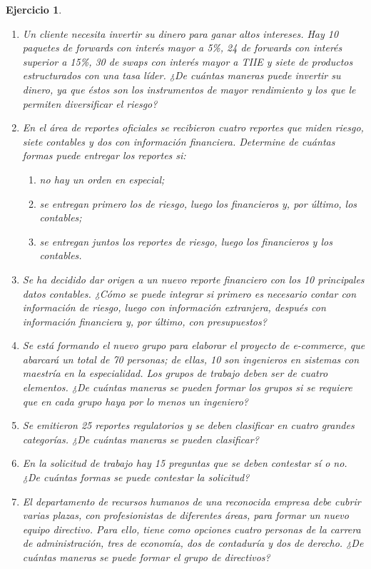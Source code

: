 \documentclass[12pt,twoside]{article}
\newtheorem{Ejer}{Ejercicio}
\begin{document}
\begin{Ejer}
\begin{enumerate}
\item Un cliente necesita invertir su dinero para ganar altos intereses. Hay 10 paquetes de forwards con interés mayor a 5\%, 24 de forwards con interés superior a 15\%, 30 de swaps con interés mayor a TIIE y siete de productos estructurados con una tasa líder. ¿De cuántas maneras puede invertir su dinero, ya que éstos son los instrumentos de mayor rendimiento y los que le permiten diversificar el riesgo?

\item En el área de reportes oficiales se recibieron cuatro reportes que miden riesgo, siete contables y dos con información financiera. Determine de cuántas formas puede entregar los reportes si:
\begin{enumerate}
\item no hay un orden en especial;
\item se entregan primero los de riesgo, luego los financieros y, por último, los contables;
\item se entregan juntos los reportes de riesgo, luego los financieros y los contables.
\end{enumerate}

\item Se ha decidido dar origen a un nuevo reporte financiero con los 10 principales datos contables. ¿Cómo se puede integrar si primero es necesario contar con información de riesgo, luego con información extranjera, después con información financiera y, por último, con presupuestos?

\item Se está formando el nuevo grupo para elaborar el proyecto de e-commerce, que abarcará un total de 70 personas; de ellas, 10 son ingenieros en sistemas con maestría en la especialidad. Los grupos de trabajo deben ser de cuatro elementos. ¿De cuántas maneras se pueden formar los grupos si se requiere que en cada grupo haya por lo menos un ingeniero?

\item Se emitieron 25 reportes regulatorios y se deben clasificar en cuatro grandes categorías. ¿De cuántas maneras se pueden clasificar?

\item En la solicitud de trabajo hay 15 preguntas que se deben contestar sí o no. ¿De cuántas formas se puede contestar la solicitud?

\item El departamento de recursos humanos de una reconocida empresa debe cubrir varias plazas, con profesionistas de diferentes áreas, para formar un nuevo equipo directivo. Para ello, tiene como opciones cuatro personas de la carrera de administración, tres de economía, dos de contaduría y dos de derecho. ¿De cuántas maneras se puede formar el grupo de directivos?


\end{enumerate}
\end{Ejer}
\end{document}
